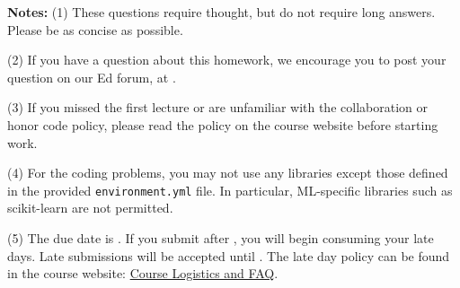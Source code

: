{\bf Notes:} 
(1) These questions require thought, but do not require long
answers. Please be as concise as possible.  

(2) If you have a question
about this homework, we encourage you to post your question on our
Ed forum, at \edstem. 

(3) If you
missed the first lecture or are unfamiliar with the collaboration or honor
code policy, please read the policy on the course website before starting work.

(4) For the coding problems, you may not
use any libraries except those defined in the provided \texttt{environment.yml}
file. In particular, ML-specific libraries such as scikit-learn are not
permitted. 

(5) The due date is \due. If you submit after
\due, you will begin consuming your
late days. Late submissions will be accepted until
\latedue. The late day policy can be found in the course website:  \href{https://docs.google.com/document/d/1PbQxBQTpp4K5hTzOJB9r8etKgsAuNPWs/edit#heading=h.gjdgxs}{Course Logistics and FAQ}.

